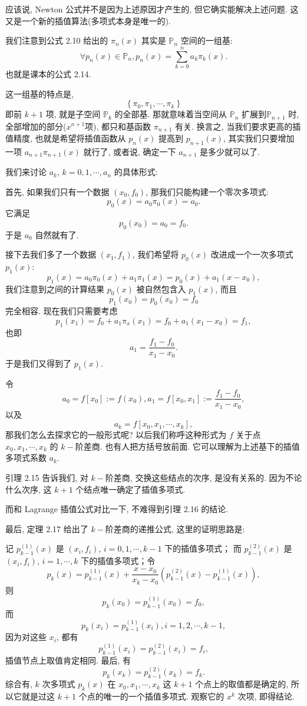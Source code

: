 \documentclass[a4paper]{ctexart}
\begin{document}
应该说, Newton 公式并不是因为上述原因才产生的, 但它确实能解决上述问题.
这又是一个新的插值算法(多项式本身是唯一的).

我们注意到公式 2.10 给出的 $\pi_n(x)$ 其实是 $\mathbb{P}_n$ 空间的一组基: 
$$
\forall p_n(x) \in \mathbb{P}_n, p_n(x) = \sum_{k = 0}^n a_k \pi_k(x).
$$
也就是课本的公式 2.14.

这一组基的特点是,
$$
\left\{\pi_0, \pi_1, \cdots, \pi_k\right\}
$$
即前 $k + 1$ 项, 就是子空间 $\mathbb{P}_k$ 的全部基. 那就意味着当空间从
$\mathbb{P}_n$ 扩展到$\mathbb{P}_{n + 1}$ 时, 全部增加的部分($x^{n + 1}项$),
都只和基函数 $\pi_{n + 1}$ 有关. 换言之, 当我们要求更高的插值精度, 也就是希望将插值函数从
$p_n(x)$ 提高到 $p_{n + 1}(x)$, 其实我们只要增加一项
$a_{n + 1}\pi_{n + 1}(x)$ 就行了, 或者说, 确定一下 $a_{n + 1}$ 是多少就可以了.

我们来讨论 $a_k$, $k = 0, 1, \cdots, a_n$
的具体形式:

首先, 如果我们只有一个数据 $(x_0, f_0)$, 那我们只能构建一个零次多项式:
$$
p_0(x) = a_0 \pi_0(x) = a_0. 
$$
它满足
$$
p_0(x_0) = a_0 = f_0.
$$
于是 $a_0$ 自然就有了.

接下去我们多了一个数据 $(x_1, f_1)$, 我们希望将 $p_0(x)$ 改进成一个一次多项式 $p_1(x)$:
$$
p_1(x) = a_0 \pi_0(x) + a_1 \pi_1(x) = p_0(x) + a_1 (x - x_0),
$$
我们注意到之间的计算结果 $p_0(x)$ 被自然包含入 $p_1(x)$, 而且
$$
p_1(x_0) = p_0(x_0) = f_0
$$
完全相容. 现在我们只需要考虑
$$
p_1(x_1) = f_0 + a_1 \pi_x(x_1) = f_0 + a_1 (x_1 - x_0) = f_1,
$$
也即
$$
a_1 = \frac{f_1 - f_0}{x_1 - x_0}.
$$
于是我们又得到了 $p_1(x)$.

令
$$
a_0 = f[x_0] := f(x_0), a_1 = f[x_0, x_1] := \frac{f_1 - f_0}{x_1 - x_0},
$$
以及
$$
a_k = f[x_0, x_1, \cdots, x_k],
$$
那我们怎么去探求它的一般形式呢? 以后我们称呼这种形式为 $f$ 关于点 $x_0, x_1, \cdots, x_k$
的 $k-$阶差商. 也有人把方括号放前面. 它可以理解为上述基下的插值多项式系数 $a_k$.

引理 2.15 告诉我们, 对 $k-$阶差商, 交换这些结点的次序, 是没有关系的. 因为不论什么次序,
这 $k + 1$ 个结点唯一确定了插值多项式.

而和 Lagrange 插值公式对比一下, 不难得到引理 2.16 的结论.

最后, 定理 2.17 给出了 $k-$阶差商的递推公式, 这里的证明思路是:

记 $p_{k - 1}^{(1)}(x)$ 是 $(x_i, f_i)$, $i = 0, 1, \cdots, k - 1$ 下的插值多项式；
而 $p_{k - 1}^{(2)}(x)$ 是 $(x_i, f_i)$, $i = 1, \cdots, k$ 下的插值多项式；令
$$
p_k(x) = p_{k - 1}^{(1)}(x)
+ \frac{x - x_0}{x_k - x_0}\left(p_{k - 1}^{(2)}(x) - p_{k - 1}^{(1)}(x)\right),
$$
则
$$
p_k(x_0) = p_{k - 1}^{(1)}(x_0) = f_0,
$$
而
$$
p_k(x_i) = p_{k - 1}^{(1)}(x_i), i = 1, 2, \cdots, k - 1,
$$
因为对这些 $x_i$, 都有
$$
p_{k - 1}^{(1)}(x_i) = p_{k - 1}^{(2)}(x_i) = f_i,
$$
插值节点上取值肯定相同. 最后, 有
$$
p_k(x_k) = p_{k - 1}^{(2)}(x_k) = f_k.
$$
综合有, $k$ 次多项式 $p_k(x)$ 在 $x_0, x_1, \cdots, x_k$ 这 $k + 1$
个点上的取值都是确定的, 所以它就是过这 $k + 1$ 个点的唯一的一个插值多项式. 观察它的 $x^k$ 次项,
即得结论.
\end{document}
